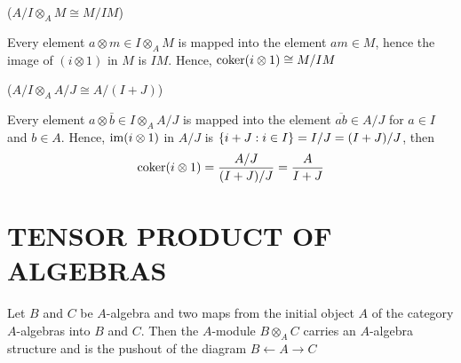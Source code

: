 \begin{longproof}
	($A / I \otimes_A M \cong M / IM$)

	\begin{center}
	\end{center}
	
	Every element $a \otimes m \in I \otimes_A M$ is mapped into the element $am \in M$, hence the image of $(i \otimes 1)$ in $M$ is $IM$. Hence, $\operatorname{coker}(i \otimes 1) \cong M / IM$
	
	($A / I \otimes_A A/J \cong A / (I + J)$)
	
	\begin{center}
	\end{center}
	
	Every element $a \otimes \bar{b} \in I \otimes_A A/J$ is mapped into the element $\overline{ab} \in A / J$ for $a \in I$ and $b \in A$. Hence, $\operatorname{im} (i \otimes 1)$ in $A/J$ is $\{i + J: i \in I\} = I / J = (I + J) / J$, then
	$$
		\operatorname{coker} (i \otimes 1) = \frac{A / J}{(I + J) / J} = \frac{A}{I + J}
	$$
\end{longproof}

\section{TENSOR PRODUCT OF ALGEBRAS}

\begin{theorem}
	Let $B$ and $C$ be $A$-algebra and two maps from the initial object $A$ of the category $A$-algebras into $B$ and $C$. Then the $A$-module $B \otimes_A C$ carries an $A$-algebra structure and is the pushout of the diagram $B \leftarrow A \rightarrow C$
	\begin{center}
	\end{center}
\end{theorem}

